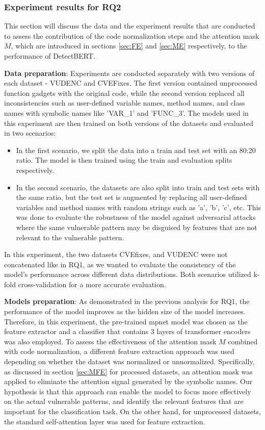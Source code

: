 \documentclass{ieeeaccess}
\begin{document}
\subsubsection{Experiment results for RQ2}


\par This section will discuss the data and the experiment results that are conducted to assess the contribution  of the code normalization steps and the attention mask $M$, which are introduced in sections \ref{sec:FE} and \ref{sec:ME} respectively,  to the performance of DetectBERT. 
\par \textbf{Data preparation}:  Experiments are conducted separately with two versions of each dataset - VUDENC and CVEFixes. The first version contained unprocessed function gadgets with the original code, while the second version replaced all inconsistencies such as user-defined variable names, method names, and class names with symbolic names like 'VAR\_1' and 'FUNC\_3'. The models used in this experiment are then trained on both versions of the datasets and evaluated in two scenarios:
\begin{itemize}
    \item In the first scenario, we split the data into a train and test set with an 80:20 ratio. The model is then trained using the train and evaluation splits respectively.
    \item In the second scenario,  the datasets are also split into train and test sets with the same ratio, but the test set is augmented by replacing all user-defined variables and method names with random strings such as 'a', 'b', 'c', etc. This was done to evaluate the robustness of the model against adversarial attacks where the same vulnerable pattern may be disguised by features that are not relevant to the vulnerable pattern.
\end{itemize}
\par In this experiment,  the two datasets CVEfixes, and VUDENC were not concatenated like in RQ1, as we wanted to evaluate the consistency of the model's performance across different data distributions. Both scenarios utilized k-fold cross-validation for a more accurate evaluation.
\par \textbf{Models preparation}: As demonstrated in the previous analysis for RQ1, the performance of the model improves as the hidden size of the model increases. Therefore, in this experiment, the pre-trained mpnet model was chosen as the feature extractor and a classifier that contains 3 layers of transformer encoders was also employed. To assess the effectiveness of the attention mask $M$ combined with code normalization, a different feature extraction approach was used depending on whether the dataset was normalized or unnormalized. Specifically, as discussed in section \ref{sec:MFE} for processed datasets,  an attention mask was applied to eliminate the attention signal generated by the symbolic names. Our hypothesis is that this approach can enable the model  to focus more effectively on the actual vulnerable patterns, and identify the relevant features that are important for the classification task. On the other hand, for unprocessed datasets, the standard self-attention layer was used for feature extraction.
\end{document}
